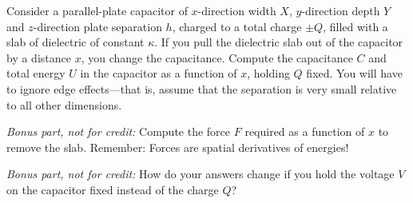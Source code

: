 \documentclass[12pt]{article}
\begin{document}
\startproblem%
Consider a parallel-plate capacitor of $x$-direction width $X$,
$y$-direction depth $Y$ and $z$-direction plate
separation $h$, charged to a total charge $\pm Q$, filled with a slab of
dielectric of constant $\kappa$.  If you pull
the dielectric slab out of the capacitor by a distance $x$, you change
the capacitance. Compute the capacitance $C$ and
total energy $U$ in the capacitor as a function of $x$, holding $Q$ fixed.
You will have to
ignore edge effects---that is, assume that the separation is very small
relative to all other dimensions.

\textsl{Bonus part, not for credit:} Compute the
force $F$ required as a function of $x$ to remove the slab.
Remember: Forces are spatial derivatives of energies!

\textsl{Bonus part, not for credit:} How do your answers change if you
hold the voltage $V$ on the capacitor fixed instead of the charge $Q$?
\end{document}
